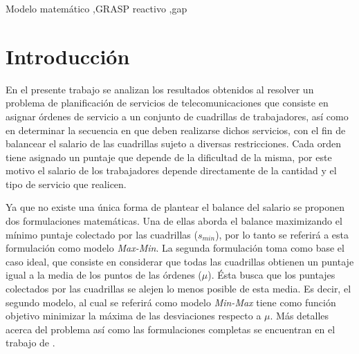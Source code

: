 \documentclass[preprint,12pt,authoryear]{elsarticle}
\begin{document}
\begin{frontmatter}

\begin{keyword}

Modelo matemático \sep GRASP reactivo \sep gap

\end{keyword}

\end{frontmatter}


\section{Introducci\'on}
\label{intro}

En el presente trabajo se analizan los resultados obtenidos al resolver un problema de planificación de servicios de telecomunicaciones que consiste en asignar órdenes de servicio a un conjunto de cuadrillas de trabajadores, así como en determinar la secuencia en que deben realizarse dichos servicios, con el fin de balancear
el salario de las cuadrillas sujeto a diversas restricciones. Cada orden tiene asignado un puntaje que depende de la dificultad de la misma, por este motivo el salario de los trabajadores depende directamente de la cantidad y el tipo de servicio que realicen.

Ya que no existe una única forma de plantear el balance del salario se proponen dos formulaciones matemáticas. Una de ellas aborda el balance maximizando el mínimo puntaje colectado por las cuadrillas ($s_{min}$), por lo tanto se referirá a esta formulación como modelo {\em Max-Min}. La segunda formulación toma como base el caso ideal, que consiste en considerar que todas las cuadrillas obtienen un puntaje igual a la media de los puntos de las órdenes ($\mu$). Ésta busca que los puntajes colectados por las cuadrillas se alejen lo menos posible de esta media. Es decir, el segundo modelo, al cual se referirá como modelo {\em Min-Max} tiene como función objetivo minimizar la máxima de las desviaciones respecto a $\mu$. Más detalles acerca del problema así como las formulaciones completas se encuentran en el trabajo de \citet{tesis}.
\end{document}
